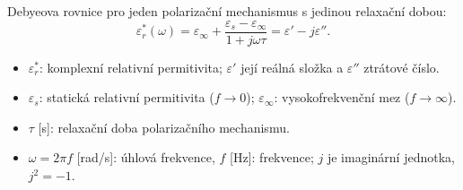 Debyeova rovnice pro jeden polarizační mechanismus s jedinou relaxační dobou:
\[\boxed{\varepsilon_r^*(\omega)=\varepsilon_\infty+\frac{\varepsilon_s-\varepsilon_\infty}{1+j\omega\tau}=\varepsilon'-j\varepsilon''}.\]
\begin{itemize}
\item $\varepsilon_r^*$: komplexní relativní permitivita; $\varepsilon'$ její reálná složka a $\varepsilon''$ ztrátové číslo.
\item $\varepsilon_s$: statická relativní permitivita ($f\to0$); $\varepsilon_\infty$: vysokofrekvenční mez ($f\to\infty$).
\item $\tau$ [s]: relaxační doba polarizačního mechanismu.
\item $\omega=2\pi f$ [rad/s]: úhlová frekvence, $f$ [Hz]: frekvence; $j$ je imaginární jednotka, $j^2=-1$.
\end{itemize}
